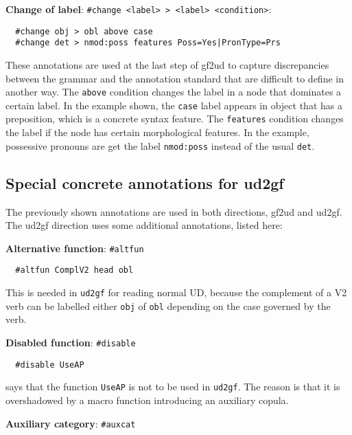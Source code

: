 \textbf{Change of label}:
\texttt{\#change\ \textless{}label\textgreater{}\ \textgreater{}\ \textless{}label\textgreater{}\ \textless{}condition\textgreater{}}:

\begin{verbatim}
  #change obj > obl above case
  #change det > nmod:poss features Poss=Yes|PronType=Prs
\end{verbatim}

These annotations are used at the last step of gf2ud to capture
discrepancies between the grammar and the annotation standard that are
difficult to define in another way. The \texttt{above} condition changes
the label in a node that dominates a certain label. In the example
shown, the \texttt{case} label appears in object that has a preposition,
which is a concrete syntax feature. The \texttt{features} condition
changes the label if the node has certain morphological features. In the
example, possessive pronouns are get the label \texttt{nmod:poss}
instead of the usual \texttt{det}.

\hypertarget{special-concrete-annotations-for-ud2gf}{%
\subsection{Special concrete annotations for
ud2gf}\label{special-concrete-annotations-for-ud2gf}}

The previously shown annotations are used in both directions, gf2ud and
ud2gf. The ud2gf direction uses some additional annotations, listed
here:

\textbf{Alternative function}: \texttt{\#altfun}

\begin{verbatim}
  #altfun ComplV2 head obl
\end{verbatim}

This is needed in \texttt{ud2gf} for reading normal UD, because the
complement of a V2 verb can be labelled either \texttt{obj} of
\texttt{obl} depending on the case governed by the verb.

\textbf{Disabled function}: \texttt{\#disable}

\begin{verbatim}
  #disable UseAP
\end{verbatim}

says that the function \texttt{UseAP} is not to be used in
\texttt{ud2gf}. The reason is that it is overshadowed by a macro
function introducing an auxiliary copula.

\textbf{Auxiliary category}: \texttt{\#auxcat}

